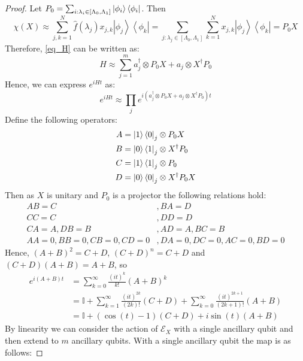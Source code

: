 \documentclass[10pt]{amsart}
\newcommand{\dm}[2]{\left|#1\right\rangle\left\langle#2\right|}
\newcommand{\EE}{{\mathcal E}}
\begin{document}
\begin{proof}
    Let $P_0 = \sum_{i: \lambda_i \in [\Lambda_0, \Lambda_1]} \ket{\phi_i}\bra{\phi_i}$. Then 
    \begin{equation}
        \chi (X) \approx \sum_{j,k=1}^{N} \hat{f}({\lambda_j})x_{j,k} \dm{\phi_j}{\phi_k} = \sum_{j: \lambda_j \in [\Lambda_0, \Lambda_1]}\sum_{k=1}^{N} x_{j,k} \dm{\phi_j}{\phi_k} = P_0 X
    \end{equation}
    Therefore, \eqref{eq_H} can be written as:
    \begin{equation}
        H \approx  \sum_{j=1}^m a_j^{\dagger}\otimes P_0 X + a_j \otimes X^{\dagger} P_0
    \end{equation}
    Hence, we can express $e^{iHt}$ as:
    \begin{equation}
        e^{iHt} \approx \prod_j e^{i(a_j^{\dagger}\otimes P_0 X + a_j \otimes X^{\dagger} P_0)t}
    \end{equation}
    Define the following operators:
    \begin{align*}
        A &= \ket{1}\bra{0}_j \otimes P_0 X\\
        B &= \ket{0}\bra{1}_j \otimes X^{\dagger} P_0\\
        C &= \ket{1}\bra{1}_j\otimes P_0\\
        D &= \ket{0}\bra{0}_j\otimes X^{\dagger}P_0 X
    \end{align*}
    Then as $X$ is unitary and $P_0$ is a projector the following relations hold:
    \begin{align*}
        AB = C&, BA = D\\
        CC = C&, DD = D \\
        CA = A, DB = B&, AD = A, BC = B \\
        AA = 0, BB = 0,CB = 0, CD = 0&,DA= 0, DC = 0, AC = 0, BD = 0
    \end{align*}
    Hence, $(A+B)^2 = C+D$, $(C+D)^n = C+D$ and $(C+D)(A+B) = A+B$, so
    \begin{align}
    e^{i(A+B)t} &= \sum_{k=0}^{\infty} \frac{(it)^k}{k!} (A+B)^k \\
    &= \mathbb{I} + \sum_{k=1}^{\infty}\frac{(it)^{2k}}{(2k)!} (C+D) + \sum_{k=0}^{\infty}\frac{(it)^{2k+1}}{(2k+1)!} (A+B)\\
    &= \mathbb{I} + (\cos(t) -1) (C+D) + i\sin(t)(A+B)
    \end{align}
    By linearity we can consider the action of $\EE_X$ with a single ancillary qubit and then extend to $m$ ancillary qubits. With a single ancillary qubit the map is as follows:

\end{proof}
\end{document}
